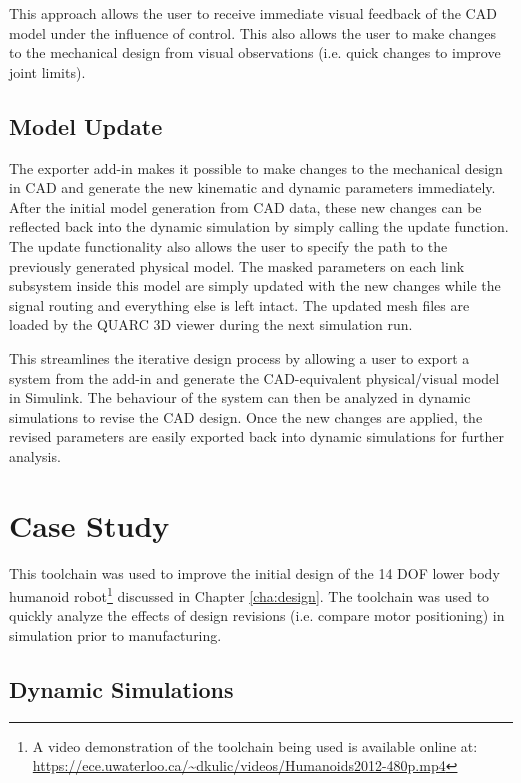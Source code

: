 This approach allows the user to receive immediate visual feedback of the CAD model under the influence of control. This also allows the user to make changes to the mechanical design from visual observations (i.e. quick changes to improve joint limits).

\subsection{Model Update} %
\label{sub:model_update}
The exporter add-in makes it possible to make changes to the mechanical design in CAD and generate the new kinematic and dynamic parameters immediately. After the initial model generation from CAD data, these new changes can be reflected back into the dynamic simulation by simply calling the update function. The update functionality also allows the user to specify the path to the previously generated physical model. The masked parameters on each link subsystem inside this model are simply updated with the new changes while the signal routing and everything else is left intact. The updated mesh files are loaded by the QUARC 3D viewer during the next simulation run.

This streamlines the iterative design process by allowing a user to export a system from the add-in and generate the CAD-equivalent physical/visual model in Simulink. The behaviour of the system can then be analyzed in dynamic simulations to revise the CAD design. Once the new changes are applied, the revised parameters are easily exported back into dynamic simulations for further analysis.


\section{Case Study} %
\label{sec:case_study}

This toolchain was used to improve the initial design of the 14 DOF lower body humanoid robot\footnote{A video demonstration of the toolchain being used is available online at: \\ \url{https://ece.uwaterloo.ca/~dkulic/videos/Humanoids2012-480p.mp4}} discussed in Chapter \ref{cha:design}. The toolchain was used to quickly analyze the effects of design revisions (i.e. compare motor positioning) in simulation prior to manufacturing.

\subsection{Dynamic Simulations} %
\label{sub:dynamic_simulations}

